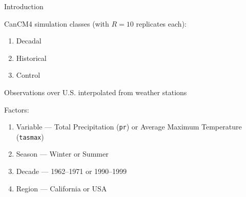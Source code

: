 \documentclass[mathserif, 11pt, t]{beamer}
\begin{document}




\begin{frame}{Introduction}

CanCM4 simulation classes (with $R=10$ replicates each):
\begin{enumerate}
\item Decadal
\item Historical
\item Control
\end{enumerate}
\bigskip

Observations over U.S. interpolated from weather stations
\bigskip

Factors:
\begin{enumerate}
\item Variable --- Total Precipitation (\texttt{pr}) or Average Maximum Temperature (\texttt{tasmax})
\item Season --- Winter or Summer
\item Decade --- 1962--1971 or 1990--1999
\item Region --- California or USA
\end{enumerate}

\end{frame}
\end{document}
